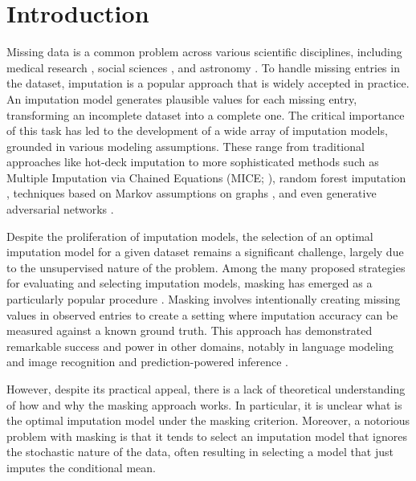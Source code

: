 \documentclass[aos, preprint]{imsart}
\theoremstyle{plain}
\theoremstyle{definition}
\begin{document}
\section{Introduction}

Missing data is a common problem across various scientific disciplines, including medical research \citep{bell2014handling}, social sciences \citep{molenberghs2014handbook}, and astronomy \citep{ivezic2020statistics}. To handle missing entries in the dataset, imputation \citep{little2019statistical, kim2021statistical, grzesiak2025needdozensmethodsreal} is a popular approach that is widely accepted in practice. An imputation model generates plausible values for each missing entry, transforming an incomplete dataset into a complete one. The critical importance of this task has led to the development of a wide array of imputation models, grounded in various modeling assumptions. These range from traditional approaches like hot-deck imputation \citep{little2019statistical} to more sophisticated methods such as Multiple Imputation via Chained Equations (MICE; \citealt{van2011mice}), random forest imputation \citep{stekhoven2012missforest}, techniques based on Markov assumptions on graphs \citep{yang2025markovmissinggraphgraphical}, and even generative adversarial networks \citep{yoon2018gain}.



Despite the proliferation of imputation models, the selection of an optimal imputation model for a given dataset remains a significant challenge, largely due to the unsupervised nature of the problem. Among the many proposed strategies for evaluating and selecting imputation models, masking has emerged as a particularly popular procedure \citep{gelman1998not,troyanskaya2001missing,honaker2011amelia, leek2012sva,qian2024unveiling,wang2024deep}. Masking involves intentionally creating missing values in observed entries 
to create a setting where imputation accuracy can be measured against a known ground truth.
This approach has demonstrated remarkable success and power in other domains, notably in language modeling \citep{yang2019xlnet,devlin2019bert} and image recognition \citep{vincent2010stacked,xie2022simmim, hondru2025masked} and prediction-powered inference \citep{angelopoulos2023ppi,wang2020methods}.


However, despite its practical appeal, 
there is a lack of theoretical understanding of how and why the masking approach works. 
In particular, it is unclear what is the optimal imputation model
under the masking criterion. 
Moreover, a notorious problem with masking is that
it tends to select an imputation model that ignores the stochastic nature of the data,
often resulting in selecting a model that just imputes the conditional mean.
\end{document}

